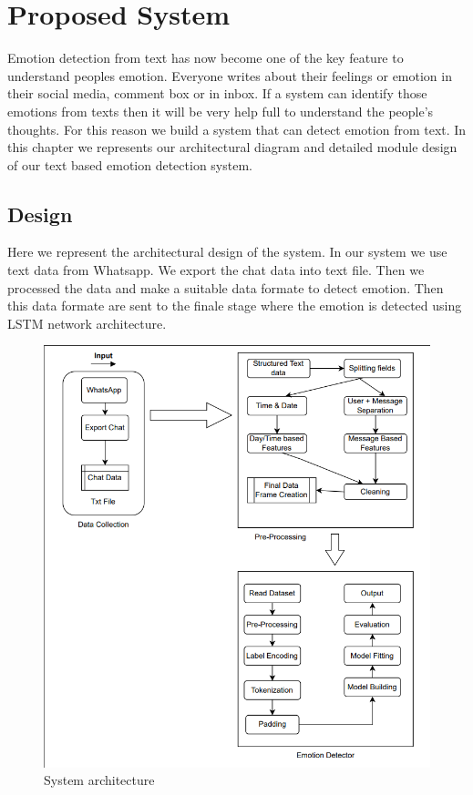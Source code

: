 \chapter{Proposed System}
\label{ch:Proposed System}
Emotion detection from text has now become one of the key feature to understand peoples emotion. Everyone writes about their feelings or emotion in their social media, comment box or in inbox. If a system can identify those emotions from texts then it will be very help full to understand the people's thoughts. For this reason we build a system that can detect emotion from text. In this chapter we represents our architectural diagram and detailed module design of our text based emotion detection system.

\section{Design}
Here we represent the architectural design of the system. In our system we use text data from Whatsapp. We export the chat data into text file. Then we processed the data and make a suitable data formate to detect emotion. Then this data formate are sent to the finale stage where the emotion is detected using LSTM network architecture.

\begin{figure}
  \includegraphics[width=\linewidth]{chapters/arcdesign.png}
  \caption{System architecture}
\end{figure}


